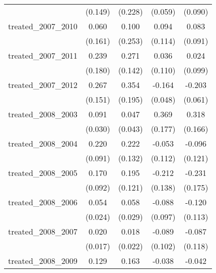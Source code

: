 {\begin{tabular}{l*{4}{c}}
            &     (0.149)         &     (0.228)         &     (0.059)         &     (0.090)         \\
[1em]
treated\_2007\_2010&       0.060         &       0.100         &       0.094         &       0.083         \\
            &     (0.161)         &     (0.253)         &     (0.114)         &     (0.091)         \\
[1em]
treated\_2007\_2011&       0.239         &       0.271         &       0.036         &       0.024         \\
            &     (0.180)         &     (0.142)         &     (0.110)         &     (0.099)         \\
[1em]
treated\_2007\_2012&       0.267         &       0.354         &      -0.164\sym{***}&      -0.203\sym{***}\\
            &     (0.151)         &     (0.195)         &     (0.048)         &     (0.061)         \\
[1em]
treated\_2008\_2003&       0.091\sym{**} &       0.047         &       0.369\sym{*}  &       0.318         \\
            &     (0.030)         &     (0.043)         &     (0.177)         &     (0.166)         \\
[1em]
treated\_2008\_2004&       0.220\sym{*}  &       0.222         &      -0.053         &      -0.096         \\
            &     (0.091)         &     (0.132)         &     (0.112)         &     (0.121)         \\
[1em]
treated\_2008\_2005&       0.170         &       0.195         &      -0.212         &      -0.231         \\
            &     (0.092)         &     (0.121)         &     (0.138)         &     (0.175)         \\
[1em]
treated\_2008\_2006&       0.054\sym{*}  &       0.058\sym{*}  &      -0.088         &      -0.120         \\
            &     (0.024)         &     (0.029)         &     (0.097)         &     (0.113)         \\
[1em]
treated\_2008\_2007&       0.020         &       0.018         &      -0.089         &      -0.087         \\
            &     (0.017)         &     (0.022)         &     (0.102)         &     (0.118)         \\
[1em]
treated\_2008\_2009&       0.129         &       0.163         &      -0.038         &      -0.042         \\

\end{tabular}}
